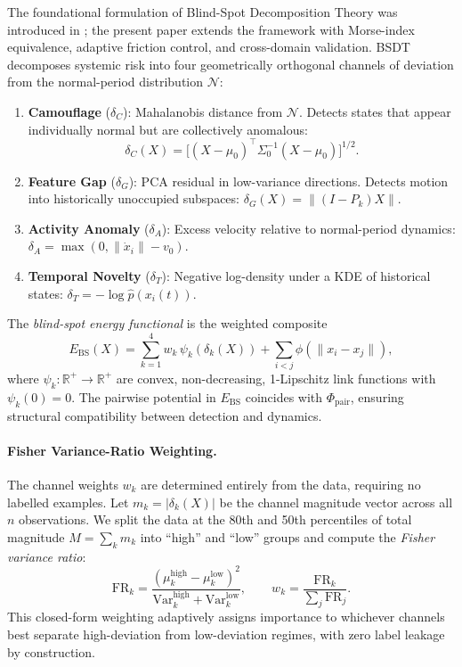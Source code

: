\documentclass[final]{siamltex}
\newcommand{\R}{\mathbb{R}}
\newcommand{\norm}[1]{\lVert #1 \rVert}
\newcommand{\Ebs}{E_{\mathrm{BS}}}
\begin{document}
The foundational formulation of Blind-Spot Decomposition Theory
was introduced in \cite{odeyemi2025bsdt}; the present paper
extends the framework with Morse-index equivalence, adaptive
friction control, and cross-domain validation.
BSDT decomposes systemic risk into four geometrically orthogonal
channels of deviation from the normal-period distribution
$\mathcal{N}$:
\begin{enumerate}
\item \textbf{Camouflage} ($\delta_C$): Mahalanobis distance from
  $\mathcal{N}$. Detects states that appear individually normal but
  are collectively anomalous:
  \[
    \delta_C(X)
    = \bigl[(X{-}\mu_0)^\top\Sigma_0^{-1}(X{-}\mu_0)\bigr]^{1/2}.
  \]

\item \textbf{Feature Gap} ($\delta_G$): PCA residual in
  low-variance directions. Detects motion into historically
  unoccupied subspaces: $\delta_G(X)=\norm{(I-P_k)X}$.

\item \textbf{Activity Anomaly} ($\delta_A$): Excess velocity
  relative to normal-period dynamics:
  $\delta_A=\max(0,\norm{\dot{x}_i}-v_0)$.

\item \textbf{Temporal Novelty} ($\delta_T$): Negative log-density
  under a KDE of historical states:
  $\delta_T=-\log\hat{p}(x_i(t))$.
\end{enumerate}

The \emph{blind-spot energy functional} is the weighted composite
\begin{equation}\label{eq:ebs}
  \Ebs(X) = \sum_{k=1}^{4}w_k\,\psi_k(\delta_k(X))
  + \sum_{i<j}\phi(\norm{x_i-x_j}),
\end{equation}
where $\psi_k:\R^+\to\R^+$ are convex, non-decreasing,
1-Lipschitz link functions with $\psi_k(0)=0$. The pairwise
potential in $\Ebs$ coincides with $\Phi_{\mathrm{pair}}$,
ensuring structural compatibility between detection and dynamics.

\paragraph{Fisher Variance-Ratio Weighting.}
The channel weights $w_k$ are determined entirely from the data,
requiring no labelled examples.  Let $m_k = |\delta_k(X)|$ be the
channel magnitude vector across all $n$ observations.  We split the
data at the 80th and 50th percentiles of total magnitude
$M = \sum_k m_k$ into ``high'' and ``low'' groups and compute the
\emph{Fisher variance ratio}:
\begin{equation}\label{eq:fisher_vr}
  \mathrm{FR}_k
  = \frac{(\mu_k^{\mathrm{high}} - \mu_k^{\mathrm{low}})^2}
         {\mathrm{Var}_k^{\mathrm{high}}
          + \mathrm{Var}_k^{\mathrm{low}}},
  \qquad
  w_k = \frac{\mathrm{FR}_k}{\sum_{j}\mathrm{FR}_j}.
\end{equation}
This closed-form weighting adaptively assigns importance to
whichever channels best separate high-deviation from low-deviation
regimes, with zero label leakage by construction.
\end{document}
